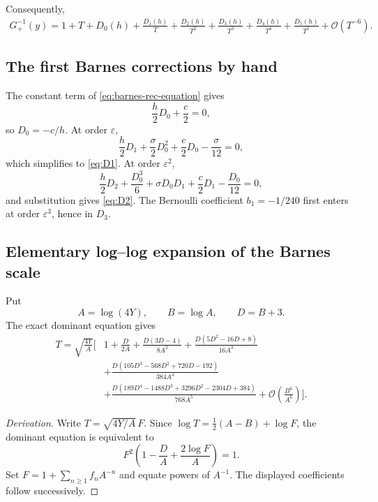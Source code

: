 \documentclass[11pt]{article}
\theoremstyle{definition}
\theoremstyle{remark}
\newcommand{\BigO}{\mathcal O}
\newcommand{\Barinv}{G_{+}^{-1}}
\begin{document}
Consequently,
\begin{equation}\label{eq:barnes-six-sector}
\begin{split}
 \Barinv(y)=1+T+D_0(h)+\frac{D_1(h)}{T}
 +\frac{D_2(h)}{T^2}+\frac{D_3(h)}{T^3}
 +\frac{D_4(h)}{T^4}+\frac{D_5(h)}{T^5}
 +\BigO(T^{-6}).
\end{split}
\end{equation}

\subsection{The first Barnes corrections by hand}

The constant term of \cref{eq:barnes-rec-equation} gives
\[
 \frac h2D_0+\frac c2=0,
\]
so \(D_0=-c/h\).  At order \(\varepsilon\),
\[
 \frac h2D_1+\frac{\sigma}{2}D_0^2
 +\frac c2D_0-\frac{\sigma}{12}=0,
\]
which simplifies to \cref{eq:D1}.  At order \(\varepsilon^2\),
\[
 \frac h2D_2+\frac{D_0^3}{6}
 +\sigma D_0D_1+\frac c2D_1-\frac{D_0}{12}=0,
\]
and substitution gives \cref{eq:D2}.  The Bernoulli coefficient
\(b_1=-1/240\) first enters at order \(\varepsilon^3\), hence in \(D_3\).

\subsection{Elementary log--log expansion of the Barnes scale}\label{sec:barnes-loglog}

Put
\begin{equation}\label{eq:barnes-log-vars}
 A=\log(4Y),\qquad B=\log A,
 \qquad D=B+3.
\end{equation}
The exact dominant equation gives
\begin{equation}\label{eq:T-barnes-loglog}
\begin{split}
 T=\sqrt{\frac{4Y}{A}}\Bigg[&1+\frac{D}{2A}
 +\frac{D(3D-4)}{8A^2}
 +\frac{D(5D^2-16D+8)}{16A^3}\\
 &+\frac{D(105D^3-568D^2+720D-192)}{384A^4}\\
 &+\frac{D(189D^4-1488D^3+3296D^2-2304D+384)}{768A^5}
 +\BigO\!\left(\frac{B^6}{A^6}\right)\Bigg].
\end{split}
\end{equation}

\begin{proof}[Derivation]
Write \(T=\sqrt{4Y/A}\,F\).  Since
\(\log T=\tfrac12(A-B)+\log F\), the dominant equation is equivalent to
\begin{equation}\label{eq:Fbarnes}
 F^2\left(1-\frac{D}{A}+\frac{2\log F}{A}\right)=1.
\end{equation}
Set \(F=1+\sum_{n\ge1}f_nA^{-n}\) and equate powers of \(A^{-1}\).  The displayed coefficients follow successively.
\end{proof}
\end{document}
